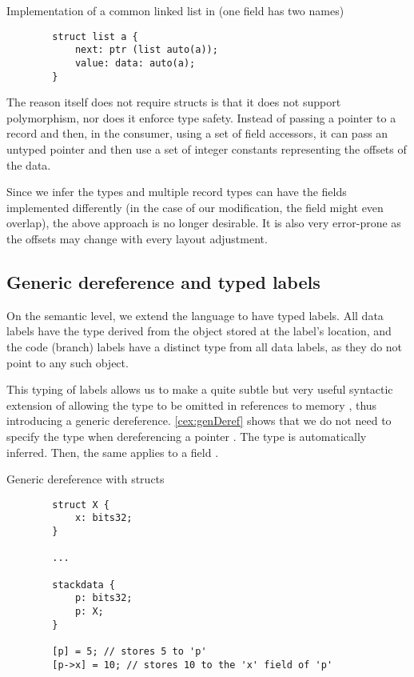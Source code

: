 \begin{codex}
    \caption{Implementation of a common linked list in \cmm (one field has two names)}
    \label{cex:list}

    \begin{lstlisting}
        struct list a {
            next: ptr (list auto(a));
            value: data: auto(a);
        }
    \end{lstlisting}
\end{codex}

The reason \cmm itself does not require structs is that it does not support polymorphism, nor does it enforce type safety. Instead of passing a pointer to a record and then, in the consumer, using a set of field accessors, it can pass an untyped pointer and then use a set of integer constants representing the offsets of the data.

Since we infer the types and multiple record types can have the fields implemented differently (in the case of our modification, the field might even overlap), the above approach is no longer desirable. It is also very error-prone as the offsets may change with every layout adjustment.

\subsection{Generic dereference and typed labels}
\label{sec:genDerefDef}

On the semantic level, we extend the language to have typed labels. All data labels have the type derived from the object stored at the label's location, and the code (branch) labels have a distinct type from all data labels, as they do not point to any such object.

This typing of labels allows us to make a quite subtle but very useful syntactic extension of allowing the type to be omitted in references to memory \cite{ramsey2005c}, thus introducing a generic dereference. \cref{cex:genDeref} shows that we do not need to specify the type when dereferencing a pointer . The type is automatically inferred. Then, the same applies to a  field .

\begin{codex}
    \caption{Generic dereference with structs}
    \label{cex:genDeref}
    \begin{lstlisting}
        struct X {
            x: bits32;
        }

        ...

        stackdata {
            p: bits32;
            p: X;
        }

        [p] = 5; // stores 5 to 'p'
        [p->x] = 10; // stores 10 to the 'x' field of 'p'
    \end{lstlisting}
\end{codex}

